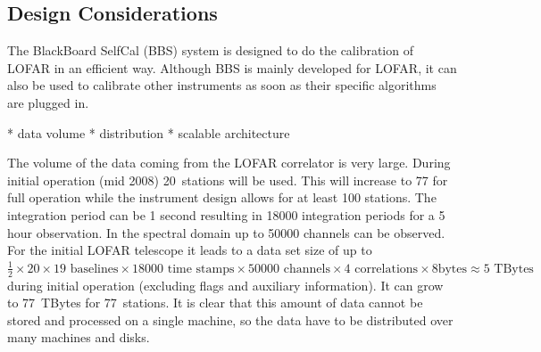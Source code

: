 \documentclass[10pt]{lofar}
\begin{document}
\subsection{Design Considerations}
\label{subsec:considerations}
The BlackBoard SelfCal (BBS) system is designed to do the calibration of LOFAR
in an efficient way. Although BBS is mainly developed for LOFAR, it can also be
used to calibrate other instruments as soon as their specific algorithms are
plugged in.

* data volume
* distribution
* scalable architecture

The volume of the data coming from the LOFAR correlator is very large. During
initial operation (mid 2008) 20~stations will be used. This will increase
to 77 for full operation while the instrument design allows for at least 100
stations. The integration period can be 1 second resulting in 18000 integration
periods for a 5 hour observation. In the spectral domain up to 50000 channels
can be observed. For the initial LOFAR telescope it leads to a data set size of
up to $\frac{1}{2} \times 20 \times 19\textrm{ baselines} \times 18000\textrm{ time stamps}
\times 50000\textrm{ channels} \times 4\textrm{ correlations} \times 8\textrm{
bytes} \approx 5\textrm{ TBytes}$
during initial operation (excluding flags and auxiliary information). It can
grow to 77~TBytes for 77~stations. It is clear that this amount of data cannot
be stored and processed on a single machine, so the data have to be distributed
over many machines and disks.
\end{document}
